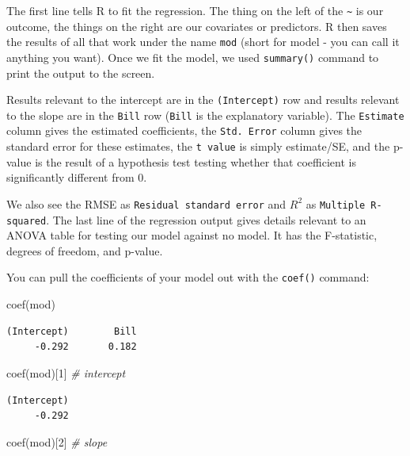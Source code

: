 \documentclass[
  letterpaper,
  DIV=11,
  numbers=noendperiod]{scrreprt}
\newenvironment{Shaded}{}{}
\newcommand{\CommentTok}[1]{\textcolor[rgb]{0.38,0.63,0.69}{\textit{#1}}}
\newcommand{\DecValTok}[1]{\textcolor[rgb]{0.25,0.63,0.44}{#1}}
\newcommand{\FunctionTok}[1]{\textcolor[rgb]{0.02,0.16,0.49}{#1}}
\newcommand{\NormalTok}[1]{#1}
\begin{document}
The first line tells R to fit the regression. The thing on the left of
the \texttt{\textasciitilde{}} is our outcome, the things on the right
are our covariates or predictors. R then saves the results of all that
work under the name \texttt{mod} (short for model - you can call it
anything you want). Once we fit the model, we used \texttt{summary()}
command to print the output to the screen.

Results relevant to the intercept are in the \texttt{(Intercept)} row
and results relevant to the slope are in the \texttt{Bill} row
(\texttt{Bill} is the explanatory variable). The \texttt{Estimate}
column gives the estimated coefficients, the \texttt{Std.\ Error} column
gives the standard error for these estimates, the \texttt{t\ value} is
simply estimate/SE, and the p-value is the result of a hypothesis test
testing whether that coefficient is significantly different from 0.

We also see the RMSE as \texttt{Residual\ standard\ error} and \(R^2\)
as \texttt{Multiple\ R-squared}. The last line of the regression output
gives details relevant to an ANOVA table for testing our model against
no model. It has the F-statistic, degrees of freedom, and p-value.

You can pull the coefficients of your model out with the \texttt{coef()}
command:

\begin{Shaded}
\begin{Highlighting}[]
\FunctionTok{coef}\NormalTok{(mod)}
\end{Highlighting}
\end{Shaded}

\begin{verbatim}
(Intercept)        Bill 
     -0.292       0.182 
\end{verbatim}

\begin{Shaded}
\begin{Highlighting}[]
\FunctionTok{coef}\NormalTok{(mod)[}\DecValTok{1}\NormalTok{] }\CommentTok{\# intercept}
\end{Highlighting}
\end{Shaded}

\begin{verbatim}
(Intercept) 
     -0.292 
\end{verbatim}

\begin{Shaded}
\begin{Highlighting}[]
\FunctionTok{coef}\NormalTok{(mod)[}\DecValTok{2}\NormalTok{] }\CommentTok{\# slope}
\end{Highlighting}
\end{Shaded}
\end{document}
